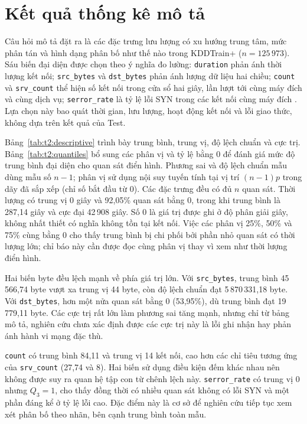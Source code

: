 \documentclass[../main.tex]{subfiles}
\begin{document}
\section{Kết quả thống kê mô tả}
Câu hỏi mô tả đặt ra là các đặc trưng lưu lượng có xu hướng trung tâm, mức phân tán và hình dạng phân bố như thế nào trong KDDTrain+ ($n=125\,973$). Sáu biến đại diện được chọn theo ý nghĩa đo lường: \texttt{duration} phản ánh thời lượng kết nối; \texttt{src\_bytes} và \texttt{dst\_bytes} phản ánh lượng dữ liệu hai chiều; \texttt{count} và \texttt{srv\_count} thể hiện số kết nối trong cửa sổ hai giây, lần lượt tới cùng máy đích và cùng dịch vụ; \texttt{serror\_rate} là tỷ lệ lỗi SYN trong các kết nối cùng máy đích \cite{task2_kdd1999}. Lựa chọn này bao quát thời gian, lưu lượng, hoạt động kết nối và lỗi giao thức, không dựa trên kết quả của Test.

Bảng~\ref{tab:t2:descriptive} trình bày trung bình, trung vị, độ lệch chuẩn và cực trị. Bảng~\ref{tab:t2:quantiles} bổ sung các phân vị và tỷ lệ bằng 0 để đánh giá mức độ trung bình đại diện cho quan sát điển hình. Phương sai và độ lệch chuẩn mẫu dùng mẫu số $n-1$; phân vị sử dụng nội suy tuyến tính tại vị trí $(n-1)p$ trong dãy đã sắp xếp (chỉ số bắt đầu từ 0). Các đặc trưng đều có đủ $n$ quan sát.
Thời lượng có trung vị 0 giây và 92,05\% quan sát bằng 0, trong khi trung bình là 287,14 giây và cực đại 42\,908 giây. Số 0 là giá trị được ghi ở độ phân giải giây, không nhất thiết có nghĩa không tồn tại kết nối. Việc các phân vị 25\%, 50\% và 75\% cùng bằng 0 cho thấy trung bình bị chi phối bởi phần nhỏ quan sát có thời lượng lớn; chỉ báo này cần được đọc cùng phân vị thay vì xem như thời lượng điển hình.

Hai biến byte đều lệch mạnh về phía giá trị lớn. Với \texttt{src\_bytes}, trung bình 45\,566,74 byte vượt xa trung vị 44 byte, còn độ lệch chuẩn đạt 5\,870\,331,18 byte. Với \texttt{dst\_bytes}, hơn một nửa quan sát bằng 0 (53,95\%), dù trung bình đạt 19\,779,11 byte. Các cực trị rất lớn làm phương sai tăng mạnh, nhưng chỉ từ bảng mô tả, nghiên cứu chưa xác định được các cực trị này là lỗi ghi nhận hay phản ánh hành vi mạng đặc thù.

\texttt{count} có trung bình 84,11 và trung vị 14 kết nối, cao hơn các chỉ tiêu tương ứng của \texttt{srv\_count} (27,74 và 8). Hai biến sử dụng điều kiện đếm khác nhau nên không được suy ra quan hệ tập con từ chênh lệch này. \texttt{serror\_rate} có trung vị 0 nhưng $Q_3=1$, cho thấy đồng thời có nhiều quan sát không có lỗi SYN và một phần đáng kể ở tỷ lệ lỗi cao. Đặc điểm này là cơ sở để nghiên cứu tiếp tục xem xét phân bố theo nhãn, bên cạnh trung bình toàn mẫu.
\FloatBarrier
\end{document}
